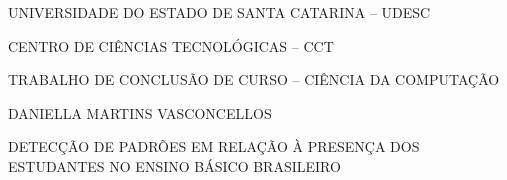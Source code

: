 

\renewcommand{\imprimircapa}{%
	\begin{capa}%
		\center

		{\fontseries{b}\selectfont\MakeTextUppercase{UNIVERSIDADE DO ESTADO DE SANTA CATARINA -- UDESC}}
		
		{\fontseries{b}\selectfont\MakeTextUppercase{CENTRO DE CIÊNCIAS TECNOLÓGICAS -- CCT  }}
		
		{\fontseries{b}\selectfont\MakeTextUppercase{TRABALHO DE CONCLUSÃO DE CURSO -- CIÊNCIA DA COMPUTAÇÃO  }}
		
		\vfill
		
		{\fontseries{b}\selectfont\MakeTextUppercase{\normalsize Daniella Martins Vasconcellos}}
		
		\vfill
		\begin{center}
			{\fontseries{b}\selectfont\MakeTextUppercase{Detecção de padrões em relação à presença dos estudantes no ensino básico brasileiro}}
		\end{center}
		\vfill
		
		\vfill
		
		{\fontseries{b}\selectfont\MakeTextUppercase{\imprimirlocal}}
		\par
		{\selectfont \imprimirdata}
		\vspace*{1cm}
	\end{capa}
}



\imprimircapa				%

